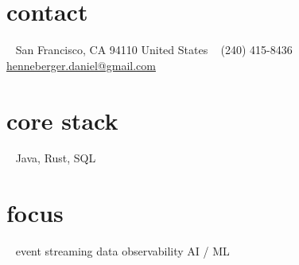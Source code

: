 \documentclass[]{friggeri-cv} %
\begin{document}


\begin{aside} %
\section{contact}
~
San Francisco, CA 94110
United States
~
(240) 415-8436
~
{\fontsize{7pt}{9pt}\selectfont\href{mailto:henneberger.daniel@gmail.com}{henneberger.daniel@gmail.com}}
\section{core stack}
~
Java, Rust, SQL
\section{focus}
~
event streaming
data observability
AI / ML
\end{aside}

\end{document}
